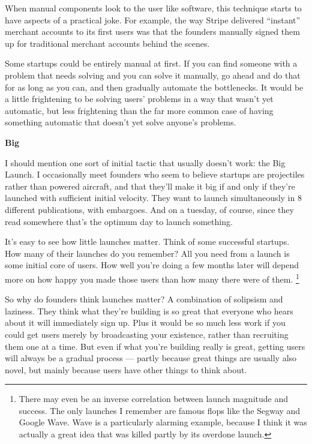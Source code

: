 \documentclass[12pt]{book}
\begin{document}
When manual components look to the user like software, this technique
starts to have aspects of a practical joke. For example, the way Stripe
delivered ``instant'' merchant accounts to its first users was that the
founders manually signed them up for traditional merchant accounts
behind the scenes.

Some startups could be entirely manual at first. If you can find someone
with a problem that needs solving and you can solve it manually, go
ahead and do that for as long as you can, and then gradually automate
the bottlenecks. It would be a little frightening to be solving users'
problems in a way that wasn't yet automatic, but less frightening than
the far more common case of having something automatic that doesn't yet
solve anyone's problems.

\textbf{Big}

I should mention one sort of initial tactic that usually doesn't work:
the Big Launch. I occasionally meet founders who seem to believe
startups are projectiles rather than powered aircraft, and that they'll
make it big if and only if they're launched with sufficient initial
velocity. They want to launch simultaneously in 8 different
publications, with embargoes. And on a tuesday, of course, since they
read somewhere that's the optimum day to launch something.

It's easy to see how little launches matter. Think of some successful
startups. How many of their launches do you remember? All you need from
a launch is some initial core of users. How well you're doing a few
months later will depend more on how happy you made those users than how
many there were of them. \footnote{There may even be an inverse correlation between launch
magnitude and success. The only launches I remember are famous flops
like the Segway and Google Wave. Wave is a particularly alarming
example, because I think it was actually a great idea that was killed
partly by its overdone launch.}

So why do founders think launches matter? A combination of solipsism and
laziness. They think what they're building is so great that everyone who
hears about it will immediately sign up. Plus it would be so much less
work if you could get users merely by broadcasting your existence,
rather than recruiting them one at a time. But even if what you're
building really is great, getting users will always be a gradual process
--- partly because great things are usually also novel, but mainly
because users have other things to think about.
\end{document}
